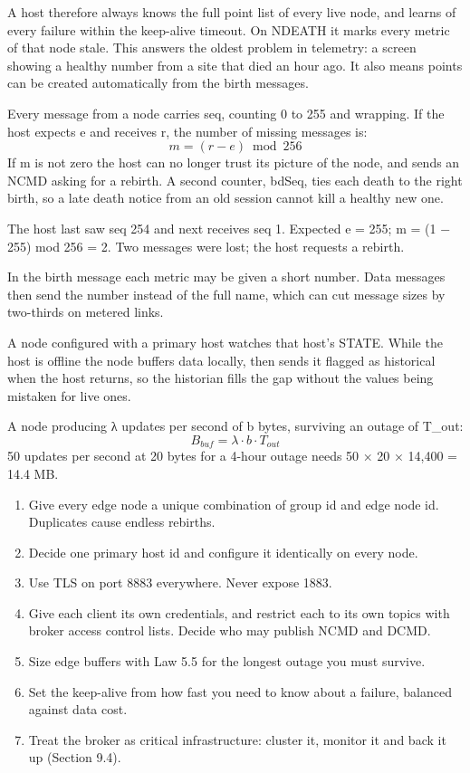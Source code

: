  A host therefore always knows the full point list of every live node, and learns of every failure within the keep-alive timeout. On NDEATH it marks every metric of that node stale. This answers the oldest problem in telemetry: a screen showing a healthy number from a site that died an hour ago. It also means points can be created automatically from the birth messages.

 Every message from a node carries seq, counting 0 to 255 and wrapping. If the host expects e and receives r, the number of missing messages is:
\[ m = (r - e) \bmod 256 \]
If m is not zero the host can no longer trust its picture of the node, and sends an NCMD asking for a rebirth. A second counter, bdSeq, ties each death to the right birth, so a late death notice from an old session cannot kill a healthy new one.

 The host last saw seq 254 and next receives seq 1. Expected e = 255; m = (1 − 255) mod 256 = 2. Two messages were lost; the host requests a rebirth.

 In the birth message each metric may be given a short number. Data messages then send the number instead of the full name, which can cut message sizes by two-thirds on metered links.

 A node configured with a primary host watches that host's STATE. While the host is offline the node buffers data locally, then sends it flagged as historical when the host returns, so the historian fills the gap without the values being mistaken for live ones.

 A node producing λ updates per second of b bytes, surviving an outage of T\_out:
\[ B_{buf} = \lambda \cdot b \cdot T_{out} \]
50 updates per second at 20 bytes for a 4-hour outage needs 50 × 20 × 14,400 = 14.4 MB.

\begin{enumerate}
\item Give every edge node a unique combination of group id and edge node id. Duplicates cause endless rebirths.
\item Decide one primary host id and configure it identically on every node.
\item Use TLS on port 8883 everywhere. Never expose 1883.
\item Give each client its own credentials, and restrict each to its own topics with broker access control lists. Decide who may publish NCMD and DCMD.
\item Size edge buffers with Law 5.5 for the longest outage you must survive.
\item Set the keep-alive from how fast you need to know about a failure, balanced against data cost.
\item Treat the broker as critical infrastructure: cluster it, monitor it and back it up (Section 9.4).
\end{enumerate}

